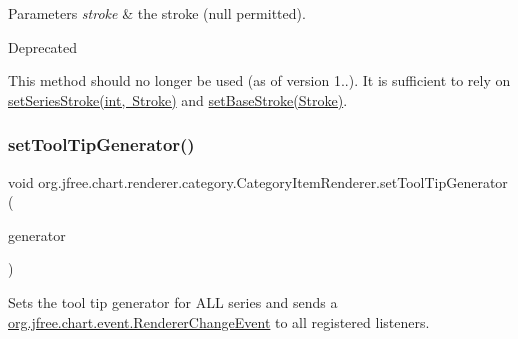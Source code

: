 \begin{DoxyParams}{Parameters}
{\em stroke} & the stroke ({\ttfamily null} permitted).\\
\hline
\end{DoxyParams}
\begin{DoxyRefDesc}{Deprecated}
\item[\mbox{\hyperlink{deprecated__deprecated000161}{Deprecated}}]This method should no longer be used (as of version 1..). It is sufficient to rely on \mbox{\hyperlink{interfaceorg_1_1jfree_1_1chart_1_1renderer_1_1category_1_1_category_item_renderer_a8caf7dacd7b0db2b0d2c524b5cd9f84a}{set\+Series\+Stroke(int, Stroke)}} and \mbox{\hyperlink{interfaceorg_1_1jfree_1_1chart_1_1renderer_1_1category_1_1_category_item_renderer_a4257e7b0cbcca4dcb130a2f0e239c0cd}{set\+Base\+Stroke(\+Stroke)}}. \end{DoxyRefDesc}
\mbox{\label{interfaceorg_1_1jfree_1_1chart_1_1renderer_1_1category_1_1_category_item_renderer_a50195768240d15b1a334a49d66aff2e8}} 
\subsubsection{\texorpdfstring{set\+Tool\+Tip\+Generator()}{setToolTipGenerator()}}
{\footnotesize\ttfamily void org.\+jfree.\+chart.\+renderer.\+category.\+Category\+Item\+Renderer.\+set\+Tool\+Tip\+Generator (\begin{DoxyParamCaption}\item[{\mbox{\hyperlink{interfaceorg_1_1jfree_1_1chart_1_1labels_1_1_category_tool_tip_generator}{Category\+Tool\+Tip\+Generator}}}]{generator }\end{DoxyParamCaption})}

Sets the tool tip generator for A\+LL series and sends a \mbox{\hyperlink{classorg_1_1jfree_1_1chart_1_1event_1_1_renderer_change_event}{org.\+jfree.\+chart.\+event.\+Renderer\+Change\+Event}} to all registered listeners.


